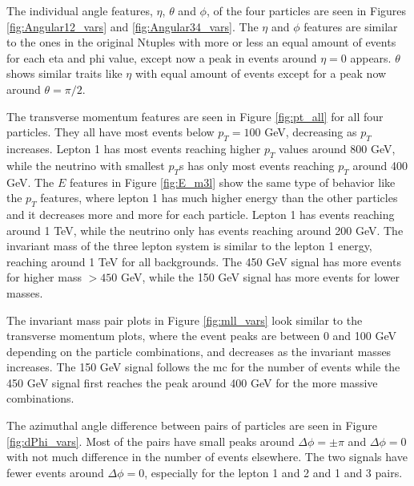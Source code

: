 \documentclass[a4paper, american, 12pt]{report}
\begin{document}
	The individual angle features, $\eta$, $\theta$ and $\phi$, of the four particles are seen in Figures \ref{fig:Angular12_vars} and \ref{fig:Angular34_vars}. The $\eta$ and $\phi$ features are similar to the ones in the original Ntuples with more or less an equal amount of events for each eta and phi value, except now a peak in events around $\eta=0$ appears. $\theta$ shows similar traits like $\eta$ with equal amount of events except for a peak now around $\theta=\pi/2$.

	The transverse momentum features are seen in Figure \ref{fig:pt_all} for all four particles. They all have most events below $p_T=100$ GeV, decreasing as $p_T$ increases. Lepton 1 has most events reaching higher $p_T$ values around 800 GeV, while the neutrino with smallest $p_T$s has only most events reaching $p_T$ around 400 GeV. The $E$ features in Figure \ref{fig:E_m3l} show the same type of behavior like the $p_T$ features, where lepton 1 has much higher energy than the other particles and it decreases more and more for each particle. Lepton 1 has events reaching around 1 TeV, while the neutrino only has events reaching around 200 GeV. The invariant mass of the three lepton system is similar to the lepton 1 energy, reaching around 1 TeV for all backgrounds. The 450 GeV signal has more events for higher mass $>450$ GeV, while the 150 GeV signal has more events for lower masses.
	
	The invariant mass pair plots in Figure \ref{fig:mll_vars} look similar to the transverse momentum plots, where the event peaks are between 0 and 100 GeV depending on the particle combinations, and decreases as the invariant masses increases. The 150 GeV signal follows the \acrshort{mc} for the number of events while the 450 GeV signal first reaches the peak around 400 GeV for the more massive combinations. 
	
	The azimuthal angle difference between pairs of particles are seen in Figure \ref{fig:dPhi_vars}. Most of the pairs have small peaks around $\Delta\phi=\pm\pi$ and $\Delta\phi=0$ with not much difference in the number of events elsewhere. The two signals have fewer events around $\Delta\phi=0$, especially for the lepton 1 and 2 and 1 and 3 pairs.
	
\end{document}
